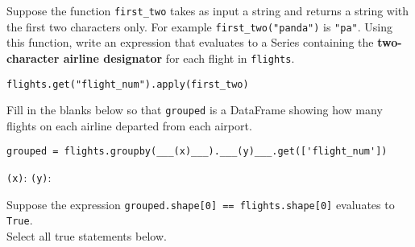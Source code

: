 \documentclass[twoside,12pt]{article}
\begin{document}
\begin{probset}

\begin{prob}
Suppose the function \texttt{first\_two} takes as input a string and returns a string with the first two characters only. For example \texttt{first\_two("panda")} is \texttt{"pa"}. Using this function, write an expression that evaluates to a Series containing the \textbf{two-character airline designator} for each flight in \texttt{flights}.

\begin{responsebox}{0.45in}
    \texttt{flights.get("flight\_num").apply(first\_two)}
\end{responsebox}
\end{prob}

\begin{prob}

\begin{subprobset}

\begin{subprob}

Fill in the blanks below so that \texttt{grouped} is a DataFrame showing how many flights on each airline departed from each airport.

 \begin{verbatim}
grouped = flights.groupby(___(x)___).___(y)___.get(['flight_num'])
\end{verbatim}   

\texttt{(x)}: 
\texttt{(y)}:  

\end{subprob}

\begin{subprob}
Suppose the expression \texttt{grouped.shape[0] == flights.shape[0]} evaluates to \texttt{True}. \\Select all true statements below.





\end{subprob}
\end{subprobset}
\end{prob}
\end{probset}
\end{document}
